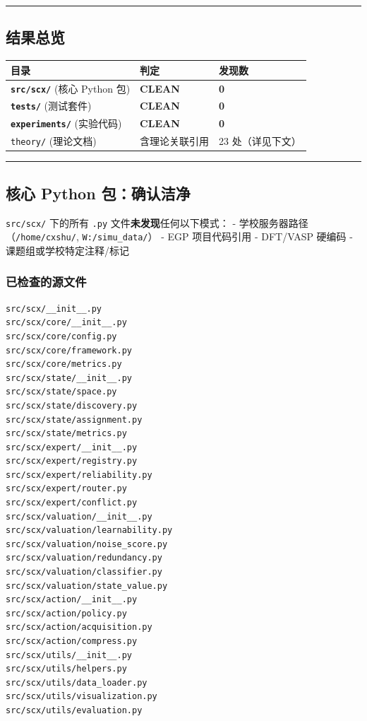 \documentclass[
  12pt,
]{ctexart}
\begin{document}
\begin{center}\rule{0.5\linewidth}{0.5pt}\end{center}

\subsection{结果总览}\label{ux7ed3ux679cux603bux89c8}

\begin{longtable}[]{@{}lll@{}}
\toprule\noalign{}
目录 & 判定 & 发现数 \\
\midrule\noalign{}
\endhead
\bottomrule\noalign{}
\endlastfoot
\textbf{\texttt{src/scx/}} (核心 Python 包) & \textbf{CLEAN} &
\textbf{0} \\
\textbf{\texttt{tests/}} (测试套件) & \textbf{CLEAN} & \textbf{0} \\
\textbf{\texttt{experiments/}} (实验代码) & \textbf{CLEAN} &
\textbf{0} \\
\texttt{theory/} (理论文档) & 含理论关联引用 & 23 处（详见下文） \\
\end{longtable}

\begin{center}\rule{0.5\linewidth}{0.5pt}\end{center}

\subsection{核心 Python
包：确认洁净}\label{ux6838ux5fc3-python-ux5305ux786eux8ba4ux6d01ux51c0}

\texttt{src/scx/} 下的所有 \texttt{.py}
文件\textbf{未发现}任何以下模式： -
学校服务器路径（\texttt{/home/cxshu/}, \texttt{W:/simu\_data/}） - EGP
项目代码引用 - DFT/VASP 硬编码 - 课题组或学校特定注释/标记

\subsubsection{已检查的源文件}\label{ux5df2ux68c0ux67e5ux7684ux6e90ux6587ux4ef6}

\begin{verbatim}
src/scx/__init__.py
src/scx/core/__init__.py
src/scx/core/config.py
src/scx/core/framework.py
src/scx/core/metrics.py
src/scx/state/__init__.py
src/scx/state/space.py
src/scx/state/discovery.py
src/scx/state/assignment.py
src/scx/state/metrics.py
src/scx/expert/__init__.py
src/scx/expert/registry.py
src/scx/expert/reliability.py
src/scx/expert/router.py
src/scx/expert/conflict.py
src/scx/valuation/__init__.py
src/scx/valuation/learnability.py
src/scx/valuation/noise_score.py
src/scx/valuation/redundancy.py
src/scx/valuation/classifier.py
src/scx/valuation/state_value.py
src/scx/action/__init__.py
src/scx/action/policy.py
src/scx/action/acquisition.py
src/scx/action/compress.py
src/scx/utils/__init__.py
src/scx/utils/helpers.py
src/scx/utils/data_loader.py
src/scx/utils/visualization.py
src/scx/utils/evaluation.py
\end{verbatim}
\end{document}
